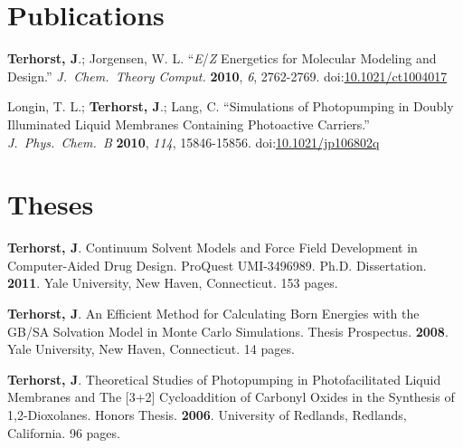 \documentclass[10pt]{article}
\newcommand*\doilink[1]{\href{http://dx.doi.org/#1}{#1}}
\newcommand*\doi[1]{doi:\doilink{#1}}
\newcommand*\pubitem[7]{{#1} {``#2''} \textit{#3} \textbf{#4}, \textit{#5}, #6. \doi{#7}}
\newcommand*\thesis[7]{#1 #2 #3. \textbf{#4}. #5, #6. {#7 pages.}}
\begin{document}
\section{Publications}


\pubitem{\textbf{Terhorst, J}.; Jorgensen, W. L.}
{\textit{E}/\textit{Z} Energetics for Molecular Modeling and Design.}
{J.\ Chem.\ Theory Comput.}
{2010}{6}%
{2762-2769}{10.1021/ct1004017}

\pubitem{Longin, T. L.; \textbf{Terhorst, J}.; Lang, C.}
{Simulations of Photopumping in Doubly Illuminated Liquid Membranes Containing Photoactive Carriers.}
{J.\ Phys.\ Chem.\ B}
{2010}{114}%
{15846-15856}{10.1021/jp106802q}


\section{Theses}


\thesis{\textbf{Terhorst, J}.}
{Continuum Solvent Models and Force Field Development in Computer-Aided Drug Design. ProQuest UMI-3496989.}
{Ph.D. Dissertation}{2011}{Yale University}{New Haven, Connecticut}{153} 

\thesis{\textbf{Terhorst, J}.}
{An Efficient Method for Calculating Born Energies with the GB/SA Solvation Model in Monte Carlo Simulations.}
{Thesis Prospectus}{2008}{Yale University}{New Haven, Connecticut}{14}

\thesis{\textbf{Terhorst, J}.}
{Theoretical Studies of Photopumping in Photofacilitated Liquid Membranes and The [3+2] Cycloaddition of Carbonyl Oxides in the Synthesis of 1,2-Dioxolanes.}
{Honors Thesis}{2006}{University of Redlands}{Redlands, California}{96}
\end{document}
